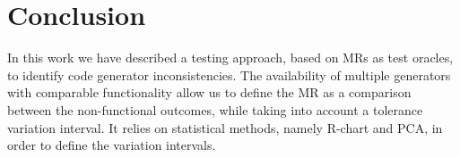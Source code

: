 







\section{Conclusion}
\label{sec:cg-conclusion}




In this work we have described a testing approach, based on MRs as test oracles, to identify code generator inconsistencies. The availability of multiple generators with comparable functionality allow us to define the MR as a comparison between the non-functional outcomes, while taking into account a tolerance variation interval. It relies on statistical methods, namely R-chart and PCA, in order to define the variation intervals.

